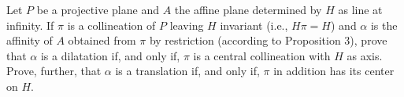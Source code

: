 Let $P$ be a projective plane and $A$ the affine plane determined by $H$ as line at infinity. If $\pi$ is a collineation of $P$ leaving $H$ invariant (i.e., $H\pi = H$) and $\alpha$ is the affinity of $A$ obtained from $\pi$ by restriction (according to Proposition 3), prove that $\alpha$ is a dilatation if, and only if, $\pi$ is a central collineation with $H$ as axis. Prove, further, that $\alpha$ is a translation if, and only if, $\pi$ in addition has its center on $H$.
